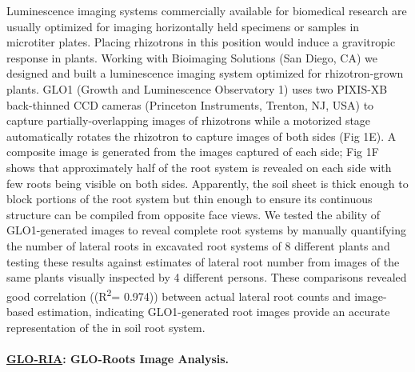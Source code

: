 \documentclass[]{article}
\begin{document}
Luminescence imaging systems commercially available for biomedical
research are usually optimized for imaging horizontally held specimens
or samples in microtiter plates. Placing rhizotrons in this position
would induce a gravitropic response in plants. Working with Bioimaging
Solutions (San Diego, CA) we designed and built a luminescence imaging
system optimized for rhizotron-grown plants. GLO1 (Growth and
Luminescence Observatory 1) uses two PIXIS-XB back-thinned CCD cameras
(Princeton Instruments, Trenton, NJ, USA) to capture
partially-overlapping images of rhizotrons while a motorized stage
automatically rotates the rhizotron to capture images of both sides (Fig
1E). A composite image is generated from the images captured of each
side; Fig 1F shows that approximately half of the root system is
revealed on each side with few roots being visible on both sides.
Apparently, the soil sheet is thick enough to block portions of the root
system but thin enough to ensure its continuous structure can be
compiled from opposite face views. We tested the ability of
GLO1-generated images to reveal complete root systems by manually
quantifying the number of lateral roots in excavated root systems of 8
different plants and testing these results against estimates of lateral
root number from images of the same plants visually inspected by 4
different persons. These comparisons revealed good correlation
((R\textsuperscript{2}= 0.974)) between actual lateral root counts and
image-based estimation, indicating GLO1-generated root images provide an
accurate representation of the in soil root system.

\paragraph{\texorpdfstring{\href{https://github.com/rr-lab/GLO-Roots/blob/master/gloria/GLORIA/manual/GLO_RIA_manual.md}{GLO-RIA}:
GLO-Roots Image
Analysis.}{GLO-RIA: GLO-Roots Image Analysis.}}\label{glo-ria-glo-roots-image-analysis.}
\end{document}
